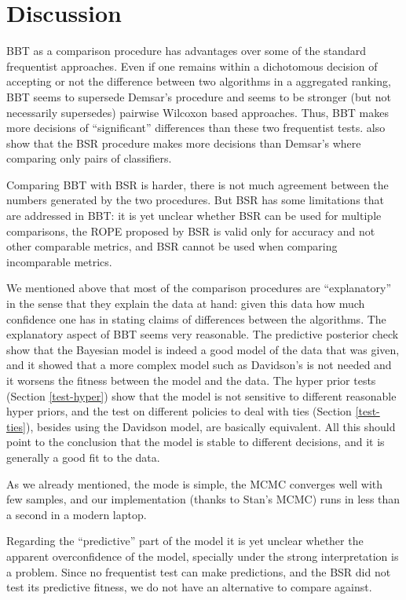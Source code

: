 \documentclass[twoside,11pt,preprint]{article}
\begin{document}
\hypertarget{discussion}{%
\section{\texorpdfstring{Discussion \label{sec:disc}}{Discussion }}\label{discussion}}

BBT as a comparison procedure has advantages over some of the standard
frequentist approaches. Even if one remains within a dichotomous
decision of accepting or not the difference between two
algorithms in a aggregated ranking, BBT seems to supersede Demsar's
procedure and seems to be stronger (but not necessarily supersedes) pairwise
Wilcoxon based approaches. Thus, BBT makes more decisions of
``significant'' differences than these two frequentist
tests. \citet{benavoli2017time} also show that the BSR procedure makes more
decisions than Demsar's where comparing only pairs of classifiers.

Comparing BBT with BSR is harder, there is not much agreement between
the numbers generated by the two procedures. But BSR has some
limitations that are addressed in BBT: it is yet unclear whether BSR
can be used for multiple comparisons, the ROPE proposed by BSR is
valid only for accuracy and not other comparable metrics, and BSR
cannot be used when comparing incomparable metrics.

We mentioned above that most of the comparison procedures are
``explanatory'' in the sense that they explain the data at hand: given
this data how much confidence one has in stating claims of differences
between the algorithms. The explanatory aspect of BBT seems very
reasonable. The predictive posterior check show that the Bayesian
model is indeed a good model of the data that was given, and it showed
that a more complex model such as Davidson's is not needed and it
worsens the fitness between the model and the data. The hyper prior
tests (Section \ref{test-hyper}) show that the model is not sensitive
to different reasonable hyper priors, and the test on different
policies to deal with ties (Section \ref{test-ties}), besides using
the Davidson model, are basically equivalent. All this should point to
the conclusion that the model is stable to different decisions, and it
is generally a good fit to the data.

As we already mentioned, the mode is simple, the MCMC converges well
with few samples, and our implementation (thanks to Stan's MCMC) runs
in less than a second in a modern laptop.

Regarding the ``predictive'' part of the model it is yet unclear whether
the apparent overconfidence of the model, specially under the strong
interpretation is a problem. Since no frequentist test can make
predictions, and the BSR did not test its predictive fitness, we do
not have an alternative to compare against.
\end{document}
